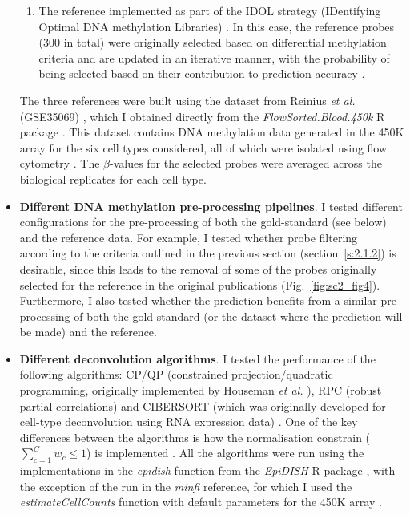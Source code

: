 \begin{itemize}
\begin{enumerate}
		\item The reference implemented as part of the \acrshort{IDOL} strategy (IDentifying Optimal DNA methylation Libraries) \cite{Koestler2016}. In this case, the reference probes (300 in total) were originally selected based on differential methylation criteria and are updated in an iterative manner, with the probability of being selected based on their contribution to prediction accuracy \cite{Koestler2016}.
	
	\end{enumerate}
	
	  The three references were built using the dataset from Reinius \textit{et al.} (GSE35069) \cite{Reinius2012}, which I obtained directly from the \textit{FlowSorted.Blood.450k} R package \cite{Jaffe2018}. This dataset contains DNA methylation data generated in the 450K array for the six cell types considered, all of which were isolated using flow cytometry \cite{Reinius2012}. The $\beta$-values for the selected probes were averaged across the biological replicates for each cell type. 
	
	\item \textbf{Different DNA methylation pre-processing pipelines}. I tested different configurations for the pre-processing of both the gold-standard (see below) and the reference data. For example, I tested whether probe filtering according to the criteria outlined in the previous section (section~\ref{s:2.1.2}) is desirable, since this leads to the removal of some of the probes originally selected for the reference in the original publications \cite{Teschendorff2017a,Koestler2016} (Fig.~\ref{fig:sc2_fig4}). Furthermore, I also tested whether the prediction benefits from a similar pre-processing of both the gold-standard (or the dataset where the prediction will be made) and the reference.
		
	\item \textbf{Different deconvolution algorithms}. I tested the performance of the following algorithms: CP/QP (constrained projection/quadratic programming, originally implemented by Houseman \textit{et al.} \cite{Houseman2012}), RPC (robust partial correlations) \cite{Teschendorff2017a} and CIBERSORT (which was originally developed for cell-type deconvolution using RNA expression data) \cite{Teschendorff2017a,Newman2015}. One of the key differences between the algorithms is how the normalisation constrain ($\sum_{c=1}^{C} w_c \leq 1$) is implemented \cite{Teschendorff2017a}. All the algorithms were run using the implementations in the \textit{epidish} function from the \textit{EpiDISH} R package \cite{Teschendorff2017b}, with the exception of the run in the \textit{minfi} reference, for which I used the \textit{estimateCellCounts} function with default parameters for the 450K array \cite{Aryee2014}. 

\end{itemize}

